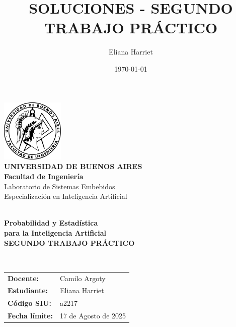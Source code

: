 \documentclass[11pt,a4paper]{article}
\title{SOLUCIONES - SEGUNDO TRABAJO PRÁCTICO}
\author{Eliana Harriet}
\date{\today}
\begin{document}
\begin{titlepage}
    \centering
    
    \vspace*{0.5cm}
    
    \includegraphics[width=3cm]{../../assets/Logo-fiuba_big.png}\\[0.5cm]
    
    {\color{ubaazul}\Large \textbf{UNIVERSIDAD DE BUENOS AIRES}}\\[0.2cm]
    {\color{ubaazul}\large \textbf{Facultad de Ingeniería}}\\[0.1cm]
    {\color{ubagris}\normalsize Laboratorio de Sistemas Embebidos}\\[0.1cm]
    {\color{ubagris}\normalsize Especialización en Inteligencia Artificial}\\[0.3cm]
    
    \rule{0cm}{0.5pt}\\[0.5cm]
    
    {\color{ubaazul}\Large \textbf{Probabilidad y Estadística}}\\[0.2cm]
    {\color{ubaazul}\Large \textbf{para la Inteligencia Artificial}}\\[0.8cm]
    
    {\Large \textbf{SEGUNDO TRABAJO PRÁCTICO}}\\[0.5cm]
    
    \rule{0cm}{0.5pt}\\[1cm]
    
    \begin{tabular}{@{}p{4cm}p{7cm}@{}}
        \textbf{Docente:} & Camilo Argoty \\[0.4cm]
        \textbf{Estudiante:} & Eliana Harriet \\[0.4cm]
        \textbf{Código SIU:} & a2217 \\[0.4cm]
        \textbf{Fecha límite:} & 17 de Agosto de 2025 \\[0.4cm]
    \end{tabular}
    
    \vfill
    
\end{titlepage}
\end{document}
